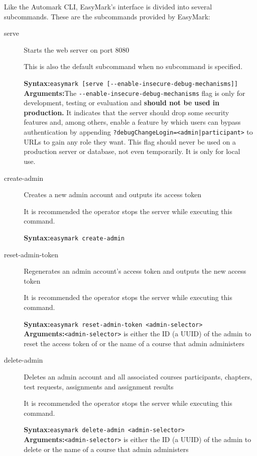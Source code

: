 \documentclass[12pt,a4paper,oneside]{report}
\begin{document}
	Like the Automark CLI, EasyMark's interface is divided into several subcommands. These are the subcommands provided by EasyMark:

	\begin{description}
		\item[serve] Starts the web server on port 8080

		This is also the default subcommand when no subcommand is specified.

		\textbf{Syntax:}\tabto{75pt}\lstinline|easymark [serve [--enable-insecure-debug-mechanisms]]|\\
		\textbf{Arguments:}\tabto{75pt}The \lstinline|--enable-insecure-debug-mechanisms| flag is only for development, testing or evaluation and \textbf{should not be used in production.} It indicates that the server should drop some security features and, among others, enable a feature by which users can bypass authentication by appending \lstinline[mathescape]!?debugChangeLogin=<admin|participant>! to URLs to gain any role they want. This flag should never be used on a production server or database, not even temporarily. It is only for local use.

		\item[create-admin] Creates a new admin account and outputs its access token

		It is recommended the operator stops the server while executing this command.

		\textbf{Syntax:}\tabto{75pt}\lstinline|easymark create-admin|

		\item[reset-admin-token] Regenerates an admin account's access token and outputs the new access token

		It is recommended the operator stops the server while executing this command.

		\textbf{Syntax:}\tabto{75pt}\lstinline|easymark reset-admin-token <admin-selector>|\\
		\textbf{Arguments:}\tabto{75pt}\lstinline|<admin-selector>| is either the ID (a UUID) of the admin to reset the access token of or the name of a course that admin administers

		\item[delete-admin] Deletes an admin account and all associated courses participants, chapters, test requests, assignments and assignment results

		It is recommended the operator stops the server while executing this command.

		\textbf{Syntax:}\tabto{75pt}\lstinline|easymark delete-admin <admin-selector>|\\
		\textbf{Arguments:}\tabto{75pt}\lstinline|<admin-selector>| is either the ID (a UUID) of the admin to delete or the name of a course that admin administers


\end{description}
\end{document}
